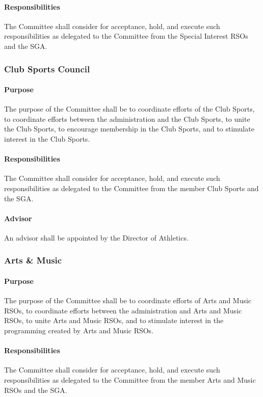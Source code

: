 \documentclass[12pt]{scrreprt}
\begin{document}
\paragraph{Responsibilities}
The Committee shall consider for acceptance, hold, and execute such 
responsibilities as delegated to the Committee from the Special Interest RSOs 
and the SGA.

\subsubsection{Club Sports Council}

\paragraph{Purpose}
The purpose of the Committee shall be to coordinate efforts of the Club 
Sports, to coordinate efforts between the administration and the Club Sports, 
to unite the Club Sports, to encourage membership in the Club Sports, and to 
stimulate interest in the Club Sports.

\paragraph{Responsibilities}
The Committee shall consider for acceptance, hold, and execute such 
responsibilities as delegated to the Committee from the member Club Sports and 
the SGA.

\paragraph{Advisor}
An advisor shall be appointed by the Director of Athletics.

\subsubsection{Arts \& Music}

\paragraph{Purpose}
The purpose of the Committee shall be to coordinate efforts of Arts and Music 
RSOs, to coordinate efforts between the administration and Arts and Music 
RSOs, to unite Arts and Music RSOs, and to stimulate interest in the 
programming created by Arts and Music RSOs.

\paragraph{Responsibilities}
The Committee shall consider for acceptance, hold, and execute such 
responsibilities as delegated to the Committee from the member Arts and Music 
RSOs and the SGA.
\end{document}
